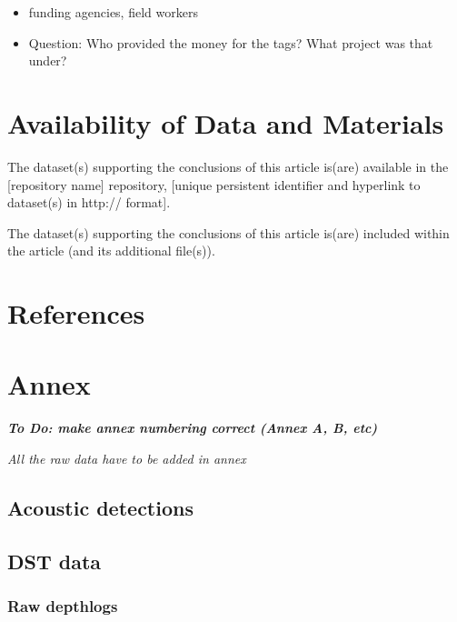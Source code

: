 \documentclass[
  authoryear,
  review,
  3p]{elsarticle}
\begin{document}
\begin{itemize}
\item
  funding agencies, field workers
\item
  Question: Who provided the money for the tags? What project was that
  under?
\end{itemize}

\hypertarget{availability-of-data-and-materials}{%
\section*{Availability of Data and
Materials}\label{availability-of-data-and-materials}}

The dataset(s) supporting the conclusions of this article is(are)
available in the {[}repository name{]} repository, {[}unique persistent
identifier and hyperlink to dataset(s) in http:// format{]}.

The dataset(s) supporting the conclusions of this article is(are)
included within the article (and its additional file(s)).

\hypertarget{references}{%
\section*{References}\label{references}}

\hypertarget{annex}{%
\section*{Annex}\label{annex}}

\textbf{\emph{To Do: make annex numbering correct (Annex A, B, etc)}}

\emph{All the raw data have to be added in annex}

\hypertarget{acoustic-detections-3}{%
\subsection{Acoustic detections}\label{acoustic-detections-3}}

\hypertarget{sec-annexdst}{%
\subsection{DST data}\label{sec-annexdst}}

\hypertarget{sec-annexdst_raw}{%
\subsubsection{Raw depthlogs}\label{sec-annexdst_raw}}
\end{document}
